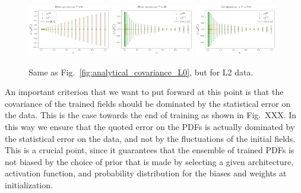 \begin{figure}[ht!]
  \centering
  \includegraphics[width=0.32\textwidth]{plots/analytical_solution/xT3/covariance/diagonal/decomposition/L2/linear/diag_error_decomposition_epoch_0_L2_linear.pdf}
  \includegraphics[width=0.32\textwidth]{plots/analytical_solution/xT3/covariance/diagonal/decomposition/L2/linear/diag_error_decomposition_epoch_50_L2_linear.pdf}
  \includegraphics[width=0.32\textwidth]{plots/analytical_solution/xT3/covariance/diagonal/decomposition/L2/linear/diag_error_decomposition_epoch_100_L2_linear.pdf}
  \caption{Same as Fig.~\ref{fig:analytical_covariance_L0}, but for L2 data.}
  \label{fig:analytical_covariance_L2}
\end{figure}


An important criterion that we want to put forward at this point is that the
covariance of the trained fields should be dominated by the statistical error on
the data. This is the case towards the end of training as shown in Fig.~XXX. In
this way we ensure that the quoted error on the PDFs is actually dominated by
the statistical error on the data, and not by the fluctuations of the initial
fields. This is a crucial point, since it guarantees that the ensemble of
trained PDFs is not biased by the choice of prior that is made by selecting a
given architecture, activation function, and probability distribution for the
biases and weights at initialization. 

\FloatBarrier
